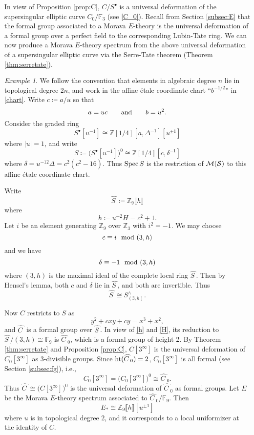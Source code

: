 \documentclass{gtpart}
\theoremstyle{definition}
\theoremstyle{remark}
\newtheorem{ex}[thm]{Example}
\newcommand{\mb}[1]{\mathbb{#1}}
\newcommand{\Spec}{{\rm Spec\thinspace}}
\newcommand{\CM}{{\cal M}}
\newcommand{\CS}{{\cal S}}
\newcommand{\BF}{{\mb F}}
\newcommand{\BZ}{{\mb Z}}
\newcommand{\HC}{\widehat{C~}\!}
\newcommand{\HS}{\widehat{S~}\!}
\newcommand{\md}{~~{\rm mod}~}
\newcommand{\ad}{{\rm and}}
\newcommand{\HT}{{\rm ht}}
\newcommand{\s}{S^\bullet}
\newcommand{\ce}{\coloneqq}
\numberwithin{equation}{section}
\numberwithin{thm}{section}
\begin{document}
In view of Proposition \ref{prop:C}, $C/\s$ is a universal deformation 
of the supersingular elliptic curve $C_0/\BF_3$ (see \eqref{C_0}).  
Recall from Section \ref{subsec:E} that the formal group associated to a 
Morava $E$-theory is the universal deformation of a formal group over a 
perfect field to the corresponding Lubin-Tate ring.  We can now produce 
a Morava $E$-theory spectrum from the above universal deformation of a 
supersingular elliptic curve via the Serre-Tate theorem (Theorem 
\ref{thm:serretate}).  

\begin{ex}
\label{ex:E}
 We follow the convention that elements in algebraic degree $n$ lie in 
 topological degree $2n$, and work in the affine \'etale coordinate 
 chart ``$b^{-1/2}$'' in \eqref{chart}.  Write $c \ce a/u$ so that 
 \[
  a = u c \qquad \ad \qquad b = u^2.  
 \]
 Consider the graded ring 
 \[
  \s[u^{-1}] \cong \BZ [1/4] [a, \Delta^{-1}] [u^{\pm1}] 
 \]
 where $|u| = 1$, and write 
 \[
  S \ce \big( \s[u^{-1}] \big)^0 \cong \BZ [1/4] [c, \delta^{-1}] 
 \]
 where $\delta = u^{-12} \Delta = c^2 (c^2 - 16)$.  Thus $\Spec S$ is 
 the restriction of $\CM(\CS)$ to this affine \'etale coordinate chart.  

 Write 
 \[
  \HS \ce \BZ_9 \llbracket h \rrbracket 
 \]
 where 
 \begin{equation}
 \label{h}
  h \ce u^{-2} H = c^2 + 1.  
 \end{equation}
 Let $i$ be an element generating $\BZ_9$ over $\BZ_3$ with $i^2 = -1$.  
 We may choose 
 \[
  c \equiv i \md (3,h) 
 \]
 and we have 
 \[
  \delta \equiv -1 \md (3,h) 
 \]
 where $(3,h)$ is the maximal ideal of the complete local ring $\HS$.  
 Then by Hensel's lemma, both $c$ and $\delta$ lie in $\HS$, and both 
 are invertible.  Thus 
 \[
  \HS \cong S_{(3,h)}^\wedge.  
 \]

 Now $C$ restricts to $S$ as 
 \begin{equation}
 \label{Cc}
  y^2 + c x y + c y = x^3 + x^2, 
 \end{equation}
 and $\HC$ is a formal group over $\HS$.  In view of \eqref{h} and 
 \eqref{H}, its reduction to $\HS / (3,h) \cong \BF_9$ is $\HC_0$, which 
 is a formal group of height 2.  By Theorem \ref{thm:serretate} and 
 Proposition \ref{prop:C}, $C[3^\infty]$ is the universal deformation of 
 $C_0[3^\infty]$ as 3-divisible groups.  Since $\HT(\HC_0) = 2$, 
 $C_0[3^\infty]$ is all formal (see Section \ref{subsec:fg}), i.e., 
 \[
  C_0[3^\infty] = \big( C_0[3^\infty] \big)^0 \cong \HC_0.  
 \]
 Thus $\HC \cong \big( C[3^\infty] \big)^0$ is the universal deformation 
 of $\HC_0$ as formal groups.  Let $E$ be the Morava $E$-theory spectrum 
 associated to $\HC_0/\BF_9$.  Then 
 \[
  E_* \cong \BZ_9 \llbracket h \rrbracket [u^{\pm 1}] 
 \]
 where $u$ is in topological degree 2, and it corresponds to a local 
 uniformizer at the identity of $C$.  
\end{ex}
\end{document}

